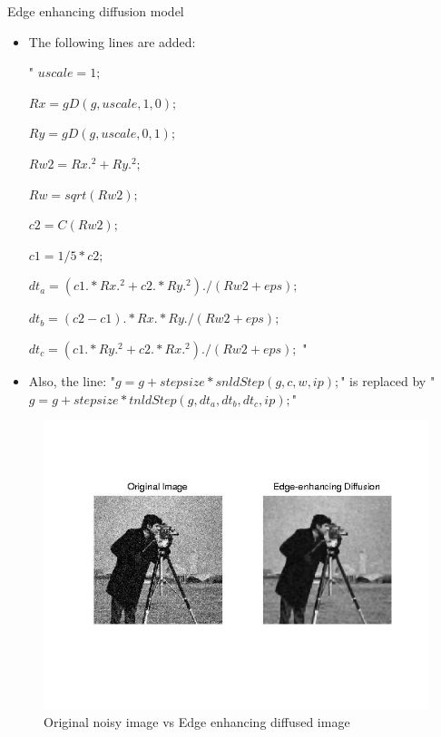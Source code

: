 \documentclass{beamer}
\begin{document}
\begin{frame}{Edge enhancing diffusion model}
    \begin{itemize}
    \item {The following lines are added:
    
"  $uscale = 1;$

   $Rx = gD(g,uscale,1,0);$

   $Ry = gD(g,uscale,0,1);$

   $Rw2 = Rx.^2+Ry.^2;$

   $Rw = sqrt(Rw2);$

   $c2 = C(Rw2);$

   $c1 = 1/5 * c2;$
   

   $dt_a = (c1.*Rx.^2+c2.*Ry.^2)./(Rw2+eps);$

   $dt_b = (c2-c1).*Rx.*Ry./(Rw2+eps);$

   $dt_c = (c1.*Ry.^2+c2.*Rx.^2)./(Rw2+eps);$ "
    }
    \item{Also, the line: "$g=g+stepsize*snldStep(g,c,w,ip);$" is replaced by "$g=g+stepsize*tnldStep(g,dt_a,dt_b,dt_c,ip);$"
}
    \end{itemize}
\end{frame}
\begin{frame}
\begin{figure}
\caption{Original noisy image vs Edge enhancing diffused image}
\includegraphics[scale=0.5]{eed.jpg}
\end{figure}
\end{frame}


\end{document}
